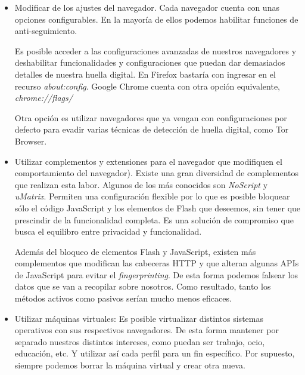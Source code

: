 \begin{itemize}
	\item Modificar de los ajustes del navegador. Cada navegador cuenta con unas opciones configurables. En la mayoría de ellos podemos habilitar funciones de anti-seguimiento. \par
	
	Es posible acceder a las configuraciones avanzadas de nuestros navegadores y deshabilitar funcionalidades y configuraciones que puedan dar demasiados detalles de nuestra huella digital. En Firefox bastaría con ingresar en el recurso \textit{about:config}. Google Chrome cuenta con otra opción equivalente, \textit{chrome://flags/} \par
	
	Otra opción es utilizar navegadores que ya vengan con configuraciones por defecto para evadir varias técnicas de detección de huella digital, como Tor Browser.
	
	\item Utilizar complementos y extensiones para el navegador que modifiquen el comportamiento del navegador\cite{pixelprivacy}). Existe una gran diversidad de complementos que realizan esta labor. Algunos de los más conocidos son \textit{NoScript} y \textit{uMatrix}.
	Permiten una configuración flexible por lo que es posible bloquear sólo el código JavaScript y los elementos de Flash que deseemos, sin tener que prescindir de la funcionalidad completa. Es una solución de compromiso que busca el equilibro entre privacidad y funcionalidad. \par
	
	Además del bloqueo de elementos Flash y JavaScript, existen más complementos que modifican las cabeceras HTTP y que alteran algunas APIs de JavaScript para evitar el \textit{fingerprinting}. De esta forma podemos falsear los datos que se van a recopilar sobre nosotros. Como resultado, tanto los métodos activos como pasivos serían mucho menos eficaces.
	
	
	\item Utilizar máquinas virtuales: Es posible virtualizar distintos sistemas operativos con sus respectivos navegadores. De esta forma mantener por separado nuestros distintos intereses, como puedan ser trabajo, ocio, educación, etc. Y utilizar así cada perfil para un fin específico. Por supuesto, siempre podemos borrar la máquina virtual y crear otra nueva\cite{restoreprivacy}.
	
\end{itemize}

